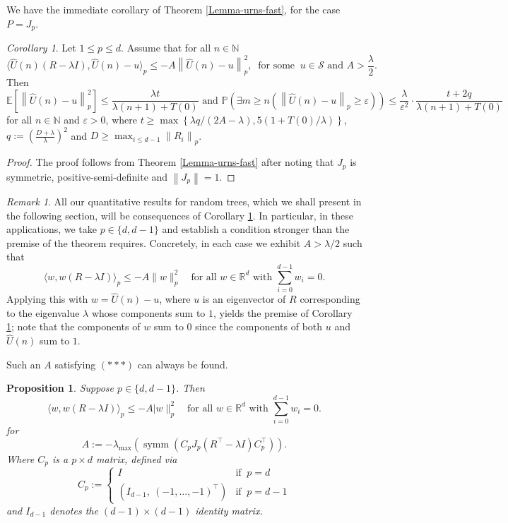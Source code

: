 \documentclass[12pt]{amsart}
\newtheorem{proposition}[theorem]{Proposition}
\theoremstyle{definition}
\theoremstyle{remark}
\newtheorem{remark}[theorem]{Remark}
\newtheorem{corollary}[theorem]{Corollary}
\newcommand{\norm}[1]{\left\lVert#1\right\rVert}
\newcommand{\NN}{\mathbb{N}}
\newcommand{\PP}{\mathbb{P}}
\newcommand{\EE}{\mathbb{E}}
\begin{document}
We have the immediate corollary of Theorem \ref{Lemma-urns-fast}, for the case $P=J_p$.

\begin{corollary}\label{Lemma-urns-fast2}
 Let  $1\le p \le d$. Assume that for all $n\in\NN$ 
  \begin{equation*}
    \langle \hat{U}(n)(R-\lambda I),\hat{U}(n) -u\rangle_p \le-A\norm{\hat{U}(n) -u}_p^2,\ \text{ for some }\ u \in \mathcal{S} \mbox{ and } A > \frac{\lambda}{2}.
\end{equation*}
 Then
  \[
\EE\left[\norm{\hat{U}(n)-u}_p^2\right]\leq\frac{\lambda t}{\lambda(n+1)+T(0)} \text{ and }\PP\left(\exists m\geq n\left(\norm{\hat{U}(n)-u}_p\geq \varepsilon\right)\right)\leq \frac{\lambda}{\varepsilon^2}\cdot\frac{t+2q}{\lambda(n+1)+T(0)}
\]
for all $n\in\mathbb{N}$ and $\varepsilon>0$, where $t\geq \max\left\{\lambda q/(2A-\lambda),5(1+T(0)/\lambda)\right\}$,
$q:=\left(\frac{D+\lambda}{\lambda}\right)^2$ and $D\ge \max_{i\le d-1}\norm{R_i}_p$.
\end{corollary}
\begin{proof}
   The proof follows from Theorem \ref{Lemma-urns-fast} after noting that $J_p$ is symmetric, positive-semi-definite and $\norm{J_p}=1$.
\end{proof}

\begin{remark}
    \label{rem:A:bound}
   All our quantitative results for random trees, which we shall present in the following section, will be consequences of  Corollary \ref{Lemma-urns-fast2}. In particular, in these applications, we take $p \in \{d,d-1\}$ and establish a condition stronger than the premise of the 
theorem requires. Concretely, in each case we exhibit $A > \lambda/2$ such that
\[
\langle w, w(R - \lambda I)\rangle_p \leq -A\|w\|_p^2 
\quad \text{for all } w \in \mathbb{R}^{d} \text{ with } 
\sum_{i=0}^{d-1} w_i = 0. \tag{***}
\]
Applying this with $w = \hat{U}(n) - u$, where $u$ is an eigenvector of $R$ 
corresponding to the eigenvalue $\lambda$ whose components sum to $1$, yields 
the premise of Corollary \ref{Lemma-urns-fast2}; note that the components of $w$ 
sum to $0$ since the components of both $u$ and $\hat{U}(n)$ sum to $1$.
\end{remark}

Such an $A$ satisfying $(***)$ can always be found.
\begin{proposition}
\label{prop:la}
Suppose $p \in \{d,d-1\}$. Then
    \[
\langle w, w(R - \lambda I)\rangle_p \leq -A|w\|_p^2 
\quad \text{for all } w \in \mathbb{R}^{d} \text{ with } 
\sum_{i=0}^{d-1} w_i = 0.
\]
for 
\[
A:= -\lambda_{\max}(\operatorname{symm}(C_p J_p
(R^\top - \lambda I)C_p^\top)).
\]
Where $C_p$ is a $p \times d$ matrix, defined via
\begin{equation*}
    C_{p} := \begin{cases}
        I & \text{if }\ p =d\\[0.5cm]
	(I_{d-1},\ (-1,\ldots,-1)^\top) & \text{if }\ p=d-1    
\end{cases}
\end{equation*}
and $I_{d-1}$ denotes the $(d-1) \times (d-1)$ identity matrix.
\end{proposition}
\end{document}
